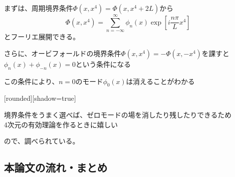 \documentclass[
  unicode,a4paper,9pt,
  xcolor = {dvipsnames,svgnames},
  hyperref ={colorlinks=true,citecolor=Navy,linkcolor=NavyBlue,urlcolor=purple},
  ja=standard,lualatex
]{beamer}
\begin{document}
\begin{frame}


  まずは、周期境界条件$\Phi(x,x^{4})=\Phi(x,x^{4}+2L)$から
  \begin{equation}
    \Phi(x,x^{4})
    =
    \sum_{n=-\infty}^{\infty}\phi_{n}(x) \exp \left[ i\frac{n\pi}{L}x^{4} \right]
    \nonumber
  \end{equation}
  とフーリエ展開できる。

  \vspace*{5pt}

  さらに、オービフォールドの境界条件$\Phi(x,x^{4})=-\Phi(x,-x^{4})$を課すと$\phi_{n}(x)+\phi_{-n}(x)=0$という条件になる

  \vspace*{5pt}

  この条件により、$n=0$のモード$\phi_{0}(x)$は消えることがわかる

  \pause
  \vspace*{5pt}

  [rounded][shadow=true]
  \begin{block}{}
    \centering
    境界条件をうまく選べば、ゼロモードの場を消したり残したりできるため
    \\
    4次元の有効理論を作るときに嬉しい
  \end{block}
  ので、調べられている。

\end{frame}


\subsection{本論文の流れ・まとめ}
\end{document}
